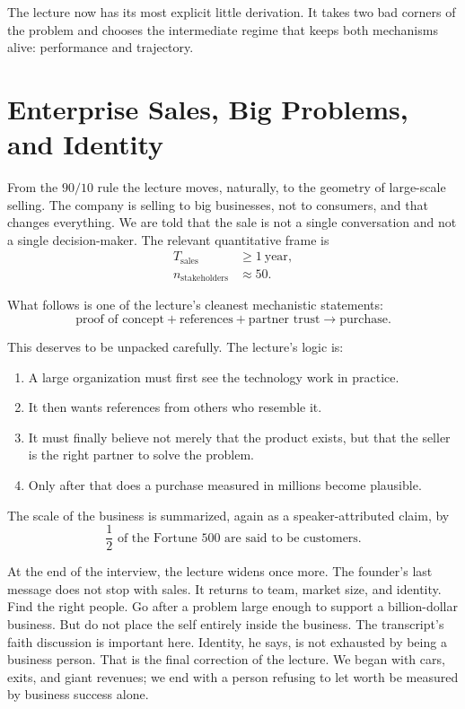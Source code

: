 The lecture now has its most explicit little derivation. It takes two bad corners of the problem and chooses the intermediate regime that keeps both mechanisms alive: performance and trajectory.

\section{Enterprise Sales, Big Problems, and Identity}

From the \(90/10\) rule the lecture moves, naturally, to the geometry of large-scale selling. The company is selling to big businesses, not to consumers, and that changes everything. We are told that the sale is not a single conversation and not a single decision-maker. The relevant quantitative frame is
\begin{align}
T_{\mathrm{sales}} &\ge 1\ \text{year},\\
n_{\mathrm{stakeholders}} &\approx 50.
\end{align}

What follows is one of the lecture's cleanest mechanistic statements:
\begin{equation}
\text{proof of concept}+\text{references}+\text{partner trust}\to\text{purchase}.
\end{equation}

This deserves to be unpacked carefully. The lecture's logic is:
\begin{enumerate}
\item A large organization must first see the technology work in practice.
\item It then wants references from others who resemble it.
\item It must finally believe not merely that the product exists, but that the seller is the right partner to solve the problem.
\item Only after that does a purchase measured in millions become plausible.
\end{enumerate}

The scale of the business is summarized, again as a speaker-attributed claim, by
\begin{equation}
\frac{1}{2}\text{ of the Fortune 500 are said to be customers.}
\end{equation}

At the end of the interview, the lecture widens once more. The founder's last message does not stop with sales. It returns to team, market size, and identity. Find the right people. Go after a problem large enough to support a billion-dollar business. But do not place the self entirely inside the business. The transcript's faith discussion is important here. Identity, he says, is not exhausted by being a business person. That is the final correction of the lecture. We began with cars, exits, and giant revenues; we end with a person refusing to let worth be measured by business success alone.

